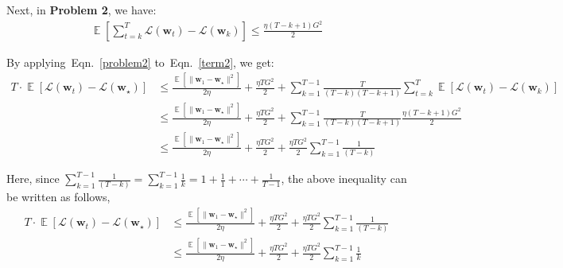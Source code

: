 \documentclass[letterpaper]{article}
\newcommand{\E}{\mathop{\mathbb{E}}}
\renewcommand{\L}{\mathcal{L}}
\newcommand{\bw}{\mathbf{w}}
\newcommand{\refequ}[1]{Eqn.~\eqref{#1}}
\begin{document}
\begin{enumerate}
	Next, in \textbf{Problem 2}, we have:
	\begin{equation}
		\begin{aligned}
			\E\left[\sum_{t=k}^{T}\L(\bw_{t})-\L(\bw_{k}) \right] \leq \frac{\eta\left(T-k+1\right)G^2}{2}
		\end{aligned}
		\label{problem2}
	\end{equation}
	
	By applying~\refequ{problem2} to~\refequ{term2}, we get:
	\begin{equation}
		\begin{aligned}
			T\cdot\E[\L(\bw_t)-\L(\bw_\star)]&\le \frac{\E[\|\bw_1-\bw_\star\|^2]}{2\eta}+\frac{\eta TG^2}{2} + \sum_{k=1}^{T-1}\frac{T}{(T-k)(T-k+1)}\sum_{t=k}^T \E[\L(\bw_t)-\L(\bw_k)]\\
			&\le \frac{\E[\|\bw_1-\bw_\star\|^2]}{2\eta}+\frac{\eta TG^2}{2} + \sum_{k=1}^{T-1}\frac{T}{(T-k)(T-k+1)}\frac{\eta\left(T-k+1\right)G^2}{2}\\
			&\le \frac{\E[\|\bw_1-\bw_\star\|^2]}{2\eta}+\frac{\eta TG^2}{2} + \frac{\eta T G^2}{2}\sum_{k=1}^{T-1}\frac{1}{(T-k)}
		\end{aligned}
	\end{equation}
	
	Here, since $\sum_{k=1}^{T-1}\frac{1}{(T-k)}=\sum_{k=1}^{T-1}\frac{1}{k}=1+\frac{1}{1}+\cdots+\frac{1}{T-1}$, the above inequality can be written as follows,
	\begin{equation}
		\begin{aligned}
			T\cdot\E[\L(\bw_t)-\L(\bw_\star)] &\le \frac{\E[\|\bw_1-\bw_\star\|^2]}{2\eta}+\frac{\eta TG^2}{2} + \frac{\eta T G^2}{2}\sum_{k=1}^{T-1}\frac{1}{(T-k)}\\
			&\le \frac{\E[\|\bw_1-\bw_\star\|^2]}{2\eta}+\frac{\eta TG^2}{2} + \frac{\eta T G^2}{2}\sum_{k=1}^{T-1}\frac{1}{k}
		\end{aligned}
	\end{equation}
	

\end{enumerate}
\end{document}
